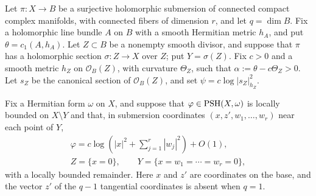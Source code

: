 Let $\pi\colon X\to B$ be a surjective holomorphic submersion of connected compact complex manifolds, with connected fibers of dimension $r$, and let $q=\dim B$. Fix a holomorphic line bundle $A$ on $B$ with a smooth Hermitian metric $h_A$, and put $\theta=c_1(A,h_A)$. Let $Z\subset B$ be a nonempty smooth divisor, and suppose that $\pi$ has a holomorphic section $\sigma\colon Z\to X$ over $Z$; put $Y=\sigma(Z)$. Fix $c>0$ and a smooth metric $h_Z$ on $\mathcal O_B(Z)$, with curvature $\Theta_Z$, such that $\alpha:=\theta-c\Theta_Z>0$. Let $s_Z$ be the canonical section of $\mathcal O_B(Z)$, and set $\psi=c\log|s_Z|_{h_Z}^2$.

Fix a Hermitian form $\omega$ on $X$, and suppose that $\varphi\in\mathrm{PSH}(X,\omega)$ is locally bounded on $X\setminus Y$ and that, in submersion coordinates $(x,z',w_1,\ldots,w_r)$ near each point of $Y$,
\begin{equation}\label{eq:horizontal-center-singularity}
 \begin{gathered}
 \varphi=c\log\left(|x|^2+\sum_{j=1}^r|w_j|^2\right)+O(1),\\
 Z=\{x=0\},\qquad Y=\{x=w_1=\cdots=w_r=0\},
 \end{gathered}
\end{equation}
with a locally bounded remainder. Here $x$ and $z'$ are coordinates on the base, and the vector $z'$ of the $q-1$ tangential coordinates is absent when $q=1$.

